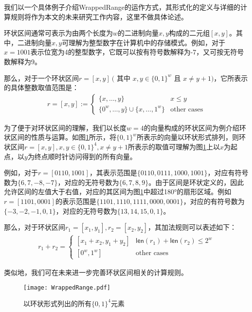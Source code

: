 我们以一个具体例子介绍WrappedRange的运作方式，其形式化的定义与详细的计算规则将作为本文的未来研究工作内容，这里不做具体论述。

环状区间通常可表示为由两个长度为$ w $的二进制向量$ x, y $构成的二元组$ [x, y] $。其中，二进制向量$ x, y $可理解为整型数字在计算机中的存储模式。例如，对于$ x = 1001 $表示位宽为4的整型数字，它既可以按有符号数解释为-7，又可按无符号数解释为9。

那么，对于一个环状区间$ r = [x, y] ~($ 其中 $x, y \in \{0, 1\}^w $ 且 $ x \ne y + 1) $，它所表示的具体整数取值范围是：
\begin{align}
	r = [x, y] := \begin{cases}
	\{x, \dots, y\} & x \le y\\
	\{0^w, \dots, y\} \cup \{x, \dots, 1^w\} & \text{other cases}
	\end{cases}
\end{align}

为了便于对环状区间的理解，我们以长度$ w = 4$的向量构成的环状区间为例介绍环状区间的性质与运算。如图\ref{fig:wrappedRange}所示，将$ \{0, 1\}^w $所表示的向量以环状形式排列，则环状区间$ r = [x, y], x, y\in \{0, 1\}^4, x \ne y + 1 $所表示的取值可理解为图\ref{fig:wrappedRange}上以$ x $为起点，以$ y $为终点顺时针访问得到的所有向量。

例如，对于$ r = [0110, 1001] $，其表示范围是$ \{0110, 0111, 1000, 1001\} $，对应有符号数为$ \{6, 7, -8, -7\} $，对应的无符号数为$ \{6, 7, 8, 9\} $。由于区间是环状定义的，因此允许区间的左值大于右值，对应的其区间为图\ref{fig:wrappedRange}中超过180°的扇形区域。例如$ r = [1101, 0001] $的表示范围是$ \{1101, 1110, 1111, 0000, 0001 \} $，对应的有符号数为$ \{-3, -2, -1, 0, 1\} $，对应的无符号数为$ \{13, 14, 15, 0, 1\} $。

那么，对于环状区间$ r_1 = [x_1, y_1], r_2 = [x_2, y_2] $，其加法规则可以表述如下：
\begin{align}
	r_1 + r_2 = \begin{cases}
	[x_1 + x_2, y_1 + y_2] & \mathsf{len}(r_1) + \mathsf{len}(r_2) \le 2^w\\
	[0^w, 1^w] & \text{other cases}
	\end{cases}
\end{align}

类似地，我们可在未来进一步完善环状区间相关的计算规则。

\begin{figure}[H]
	\centering
	\texttt{[image: WrappedRange.pdf]}
	\caption{以环状形式列出的所有$ \{0, 1\}^4 $元素}
	\label{fig:wrappedRange}
\end{figure}

